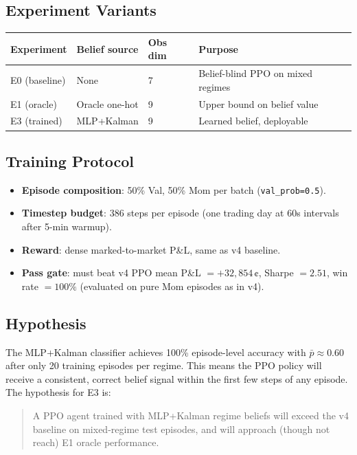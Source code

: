 \documentclass[11pt]{article}
\begin{document}
\subsection{Experiment Variants}

\begin{center}
\begin{tabular}{llll}
\toprule
\textbf{Experiment} & \textbf{Belief source} & \textbf{Obs dim} & \textbf{Purpose} \\
\midrule
E0 (baseline)  & None          & 7 & Belief-blind PPO on mixed regimes \\
E1 (oracle)    & Oracle one-hot & 9 & Upper bound on belief value \\
E3 (trained)   & MLP+Kalman    & 9 & Learned belief, deployable \\
\bottomrule
\end{tabular}
\end{center}

\subsection{Training Protocol}

\begin{itemize}[nosep]
  \item \textbf{Episode composition}: 50\% Val, 50\% Mom per batch
        (\texttt{val\_prob=0.5}).
  \item \textbf{Timestep budget}: 386 steps per episode (one trading day at
        60s intervals after 5-min warmup).
  \item \textbf{Reward}: dense marked-to-market P\&L, same as v4 baseline.
  \item \textbf{Pass gate}: must beat v4 PPO mean P\&L $= +32{,}854$\,¢,
        Sharpe $= 2.51$, win rate $= 100\%$ (evaluated on pure Mom episodes
        as in v4).
\end{itemize}

\subsection{Hypothesis}

The MLP+Kalman classifier achieves 100\% episode-level accuracy with
$\bar{p} \approx 0.60$ after only 20 training episodes per regime.  This
means the PPO policy will receive a consistent, correct belief signal within
the first few steps of any episode.  The hypothesis for E3 is:

\begin{quote}
A PPO agent trained with MLP+Kalman regime beliefs will exceed the v4
baseline on mixed-regime test episodes, and will approach (though not reach)
E1 oracle performance.
\end{quote}
\end{document}
